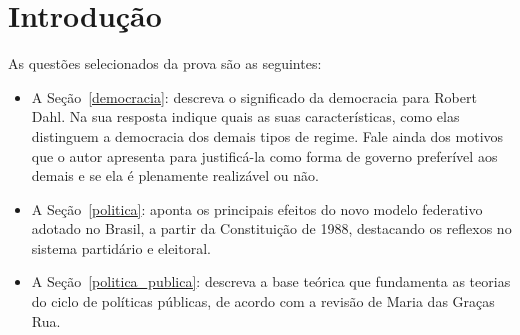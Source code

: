 \section*{Introdução}

As questões selecionados da prova são as seguintes:

\begin{itemize}
    \item A Seção~\ref{democracia}: descreva o significado da democracia para Robert Dahl. 
    Na sua resposta indique quais as suas características, como elas distinguem a democracia dos demais tipos de regime. 
    Fale ainda dos motivos que o autor apresenta para justificá-la como forma de governo preferível aos demais e se ela é plenamente realizável ou não. 
    
    \item A Seção~\ref{politica}: aponta os principais efeitos do novo modelo federativo adotado no Brasil, a partir da Constituição de 1988, destacando os reflexos no sistema partidário e eleitoral.

    \item A Seção~\ref{politica_publica}: descreva a base teórica que fundamenta as teorias do ciclo de políticas públicas, de acordo com a revisão de Maria das Graças Rua.
\end{itemize}

